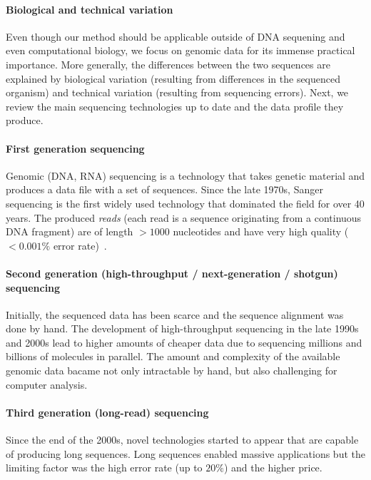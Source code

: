 \paragraph{Biological and technical variation}
Even though our method should be applicable outside of DNA sequening and even
computational biology, we focus on genomic data for its immense practical
importance. More generally, the differences between the two sequences are
explained by biological variation (resulting from differences in the sequenced
organism) and technical variation (resulting from sequencing errors). Next, we
review the main sequencing technologies up to date and the data profile they
produce.

\paragraph{First generation sequencing}
Genomic (DNA, RNA) sequencing is a technology that takes genetic material and
produces a data file with a set of sequences. Since the late 1970s, Sanger
sequencing is the first widely used technology that dominated the field for over
40 years. The produced \emph{reads} (each read is a sequence originating from a
continuous DNA fragment) are of length ${>}1000$ nucleotides and have very high
quality (${<}0.001\%$ error rate)~\citep{shendure2008next}.

\paragraph{Second generation (high-throughput / next-generation / shotgun) sequencing}
Initially, the sequenced data has been scarce and the sequence alignment was
done by hand. The development of high-throughput sequencing in the late 1990s
and 2000s lead to higher amounts of cheaper data due to sequencing millions and
billions of molecules in parallel. The amount and complexity of the available
genomic data bacame not only intractable by hand, but also challenging for
computer analysis.

\paragraph{Third generation (long-read) sequencing}
Since the end of the 2000s, novel technologies started to appear that are
capable of producing long sequences. Long sequences enabled massive applications
but the limiting factor was the high error rate (up to $20\%$) and the higher
price.

